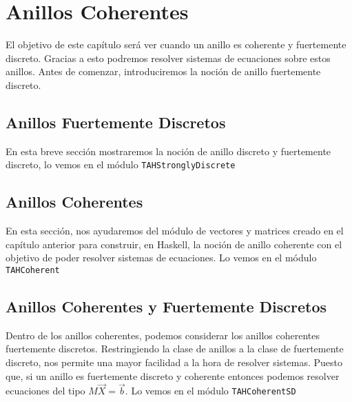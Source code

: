 \chapter{Anillos Coherentes}\label{sec:coherentHas}
El objetivo de este capítulo será ver cuando un anillo es coherente y fuertemente discreto. Gracias a esto podremos resolver sistemas de ecuaciones sobre estos anillos. Antes de comenzar, introduciremos la noción de anillo fuertemente discreto.
\section{Anillos Fuertemente Discretos}
En esta breve sección mostraremos la noción de anillo discreto y fuertemente discreto, lo vemos en el módulo \texttt{TAHStronglyDiscrete} 

\section{Anillos Coherentes}
En esta sección, nos ayudaremos del módulo de vectores y matrices creado en el capítulo anterior para construir, en Haskell, la noción de anillo coherente con el objetivo de poder resolver sistemas de ecuaciones. Lo vemos en el módulo \texttt{TAHCoherent} 

\section{Anillos Coherentes y Fuertemente Discretos }
Dentro de los anillos coherentes, podemos considerar los anillos coherentes fuertemente discretos. Restringiendo la clase de anillos a la clase de fuertemente discreto, nos permite una mayor facilidad a la hora de resolver sistemas. Puesto que, si un anillo es fuertemente discreto y coherente entonces podemos resolver ecuaciones del tipo $M\vec{X}=\vec{b}$. Lo vemos en el módulo \texttt{TAHCoherentSD} 


